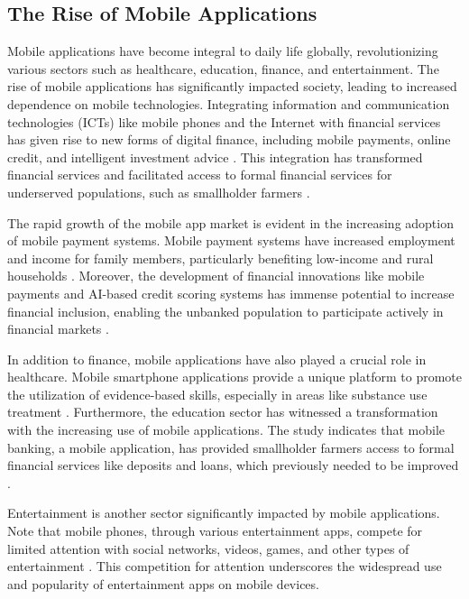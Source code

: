 \subsection{The Rise of Mobile Applications }
Mobile applications have become integral to daily life globally, revolutionizing various sectors such as healthcare, education, finance, and entertainment. The rise of mobile applications has significantly impacted society, leading to increased dependence on mobile technologies. Integrating information and communication technologies (ICTs) like mobile phones and the Internet with financial services has given rise to new forms of digital finance, including mobile payments, online credit, and intelligent investment advice \cite{li2022impact}. This integration has transformed financial services and facilitated access to formal financial services for underserved populations, such as smallholder farmers \cite{omar2022predictors}.
\par
The rapid growth of the mobile app market is evident in the increasing adoption of mobile payment systems. Mobile payment systems have increased employment and income for family members, particularly benefiting low-income and rural households \cite{wang2020mobile}. Moreover, the development of financial innovations like mobile payments and AI-based credit scoring systems has immense potential to increase financial inclusion, enabling the unbanked population to participate actively in financial markets \cite{rybakovas2022financial}.
\par
In addition to finance, mobile applications have also played a crucial role in healthcare. Mobile smartphone applications provide a unique platform to promote the utilization of evidence-based skills, especially in areas like substance use treatment \cite{dahne2015smartphone}. Furthermore, the education sector has witnessed a transformation with the increasing use of mobile applications. The study indicates that mobile banking, a mobile application, has provided smallholder farmers access to formal financial services like deposits and loans, which previously needed to be improved \cite{omar2022predictors}.
\par
Entertainment is another sector significantly impacted by mobile applications. Note that mobile phones, through various entertainment apps, compete for limited attention with social networks, videos, games, and other types of entertainment \cite{zhang2023entertainment}. This competition for attention underscores the widespread use and popularity of entertainment apps on mobile devices.
